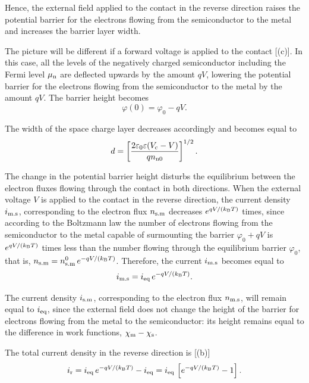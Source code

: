 Hence, the external field applied to the contact in the reverse direction raises the potential barrier for the electrons flowing from the semiconductor to the metal and increases the barrier layer width.

The picture will be different if a forward voltage is applied to the contact [(c)]. In this case, all the levels of the negatively charged semiconductor including the Fermi level $\mu_{\text{n}}$ are deflected upwards by the amount $qV$, lowering the potential barrier for the electrons flowing from the semiconductor to the metal by the amount $qV$. The barrier height becomes
\begin{equation}\label{eq:8_12}
    \varphi(0) = \varphi_0 - qV.
\end{equation}

The width of the space charge layer decreases accordingly and becomes equal to
\begin{equation}\label{eq:8_13}
    d = \left[\frac{2 \varepsilon_0 \varepsilon (V_{\text{c}} - V)}{q n_{\text{n$0$}}}\right]^{1/2}.
\end{equation}

The change in the potential barrier height disturbs the equilibrium between the electron fluxes flowing through the contact in both directions. When the external voltage $V$ is applied to the contact in
the reverse direction, the current density $i_{\text{m.s}}$, corresponding to the electron flux $n_{\text{s.m}}$ decreases $e^{qV/(k_{\text{B}}T)}$ times, since according to the Boltzmann law the number of electrons flowing from the semiconductor to the metal capable of surmounting the barrier $\varphi_0+qV$ is $e^{qV/(k_{\text{B}}T)}$ times less than the number flowing through the equilibrium barrier $\varphi_0$, that is, $n_{\text{s.m}}=n_{\text{s.m}}^0\,e^{-qV/(k_{\text{B}}T)}$.
Therefore, the current $i_{\text{m.s}}$ becomes equal to
\begin{equation*}
    i_{\text{m.s}} = i_{\text{eq}}\, e^{-qV/(k_{\text{B}}T)}.
\end{equation*}

The current density $i_{\text{s.m}}$, corresponding to the electron flux $n_{\text{m.s}}$, will remain equal to $i_{\text{eq}}$, since the external field does not change the height of the barrier for electrons flowing from the metal to the semiconductor: its height remains equal to the difference in work functions, $\chi_{\text{m}}-\chi_{\text{s}}$.

The total current density in the reverse direction is [(b)]
\begin{equation}\label{eq:8_14}
    i_{\text{r}} = i_{\text{eq}}\, e^{-qV/(k_{\text{B}}T)} - i_{\text{eq}} = i_{\text{eq}}\, \left[e^{-qV/(k_{\text{B}}T)} - 1\right].
\end{equation}

